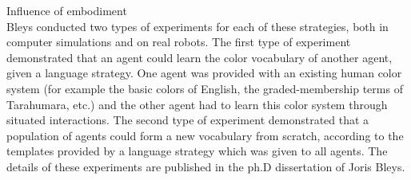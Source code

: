 {\bfshape Influence of embodiment}\\

Bleys conducted two types of experiments for each of these strategies, both in computer simulations and on 
real robots. The first type of experiment demonstrated that an agent could learn the color vocabulary of another agent, 
given a language strategy. One agent was provided with an existing human color system (for example the basic colors 
of English, the graded-membership terms of Tarahumara, etc.) and the other agent had to learn this color system through
situated interactions. The second type of experiment demonstrated that a population of agents could form a new 
vocabulary from scratch, according to the templates provided by a language strategy which was given to all agents. 
The details of these experiments are published in the ph.D dissertation of Joris Bleys.\cite{Bleys:2014}

